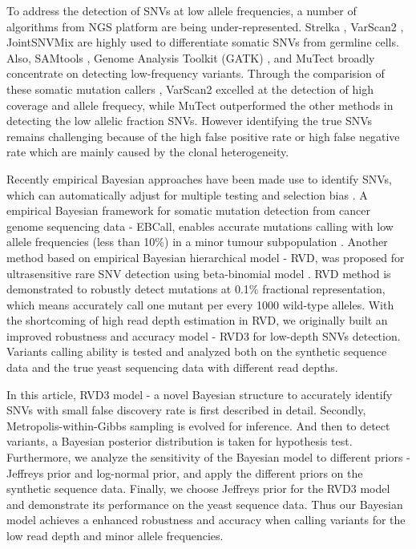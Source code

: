 \documentclass[11pt,reqno]{amsart}
\begin{document}
To address the detection of SNVs at low allele frequencies, a number of algorithms from NGS platform are being under-represented.
Strelka \citep{Saunders:2012fh}, VarScan2 \citep{Koboldt:2012cga}, JointSNVMix \citep{roth2012jointsnvmix} are highly used to differentiate somatic SNVs from germline cells.
Also, SAMtools \citep{li2009sequence}, Genome Analysis Toolkit (GATK) \citep{McKenna:2010bva}, and MuTect \citep{Cibulskis:2013ta} broadly concentrate on detecting low-frequency variants.
Through the comparision of these somatic mutation callers \citep{wang2013detecting}, VarScan2 excelled at the detection of high coverage and allele frequecy, while MuTect outperformed the other methods in detecting the low allelic fraction SNVs.
However identifying the true SNVs remains challenging because of the high false positive rate or high false negative rate which are mainly caused by the clonal heterogeneity.

Recently empirical Bayesian approaches have been made use to identify SNVs, which can automatically adjust for multiple testing and selection bias \citep{liao2014prior}.
A empirical Bayesian framework for somatic mutation detection from cancer genome sequencing data - EBCall, enables accurate mutations calling with low allele frequencies (less than 10\%) in a minor tumour subpopulation \citep{shiraishi2013empirical}.
Another method based on empirical Bayesian hierarchical model - RVD, was proposed for ultrasensitive rare SNV detection using beta-binomial model \citep{Flaherty:2011ja}.
RVD method is demonstrated to robustly detect mutations at 0.1\% fractional representation, which means accurately call one mutant per every 1000 wild-type alleles.
With the shortcoming of high read depth estimation in RVD, we originally built an improved robustness and accuracy model - RVD3 for low-depth SNVs detection.
Variants calling ability is tested and analyzed both on the synthetic sequence data and the true yeast sequencing data with different read depths.

In this article, RVD3 model - a novel Bayesian structure to accurately identify SNVs with small false discovery rate is first described in detail.
Secondly, Metropolis-within-Gibbs sampling is evolved for inference. And then to detect variants, a Bayesian posterior distribution is taken for hypothesis test.
Furthermore, we analyze the sensitivity of the Bayesian model to different priors - Jeffreys prior and log-normal prior, and apply the different priors on the synthetic sequence data.
Finally, we choose Jeffreys prior for the RVD3 model and demonstrate its performance on the yeast sequence data.
Thus our Bayesian model achieves a enhanced robustness and accuracy when calling variants for the low read depth and minor allele frequencies.
\end{document}
